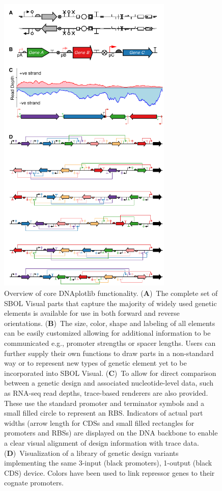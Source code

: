 \documentclass{bioinfo}
\begin{document}
\begin{figure}[t]
\centering
\includegraphics[width=8.3cm]{Figure1.pdf}
\caption{\label{fig:overview}Overview of core DNAplotlib functionality. (\textbf{A})~The complete set of SBOL Visual parts that capture the majority of widely used genetic elements is available for use in both forward and reverse orientations. (\textbf{B})~The size, color, shape and labeling of all elements can be easily customized allowing for additional information to be communicated e.g., promoter strengths or spacer lengths. Users can further supply their own functions to draw parts in a non-standard way or to represent new types of genetic element yet to be incorporated into SBOL Visual. (\textbf{C})~To allow for direct comparison between a genetic design and associated nucleotide-level data, such as RNA-seq read depths, trace-based renderers are also provided. These use the standard promoter and terminator symbols and a small filled circle to represent an RBS. Indicators of actual part widths (arrow length for CDSs and small filled rectangles for promoters and RBSs) are displayed on the DNA backbone to enable a clear visual alignment of design information with trace data. (\textbf{D})~Visualization of a library of genetic design variants implementing the same 3-input (black promoters), 1-output (black CDS) device. Colors have been used to link repressor genes to their cognate promoters.}
\end{figure}
\end{document}
